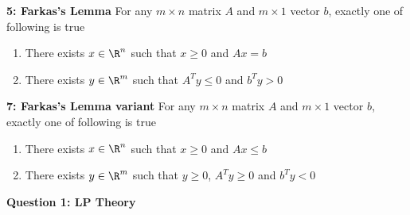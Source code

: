\documentclass[11pt]{article}
\begin{document}
\begin{lemma*}
    \textbf{5: Farkas's Lemma} For any $m\times n$ matrix $A$ and $m\times 1$ vector $b$, exactly one of following is true 
    \begin{enumerate}
        \item There exists $x\in \R^n$ such that $x\geq 0$ and $Ax = b$ 
        \item There exists $y\in \R^m$ such that $A^T y \leq 0$ and $b^T y > 0$ 
    \end{enumerate}
\end{lemma*}

\begin{lemma*}
    \textbf{7: Farkas's Lemma variant} For any $m\times n$ matrix $A$ and $m\times 1$ vector $b$, exactly one of following is true 
    \begin{enumerate}
        \item There exists $x\in \R^n$ such that $x\geq 0$ and $Ax \leq b$ 
        \item There exists $y\in \R^m$ such that $y\geq 0$, $A^T y \geq 0$ and $b^T y < 0$ 
    \end{enumerate}
\end{lemma*}

$ $\\

\textbf{Question 1: LP Theory} 
\end{document}
